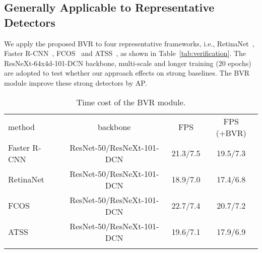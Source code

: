 \documentclass{article}
\def\ie{{i.e.}}
\begin{document}
\subsection{Generally Applicable to Representative Detectors}
\vspace{-2mm}
We apply the proposed BVR to four representative frameworks, \ie, RetinaNet~\cite{RetinaNet}, Faster R-CNN~\cite{ren2015faster,FPN}, FCOS~\cite{FCOS} and ATSS~\cite{zhang2019bridging}, as shown in Table~\ref{tab:verification}. The ResNeXt-64x4d-101-DCN backbone, multi-scale and longer training (20 epochs) are adopted to test whether our approach effects on strong baselines. The BVR module improve these strong detectors by  AP.

\begin{table}[t]
  \caption{Time cost of the BVR module.}
  \small
  \label{tab:inf}
  \centering
  \begin{tabular}{l|c|c|c}
    \Xhline{1.0pt}
    method & backbone & FPS & FPS (+BVR)\\
    \Xhline{1.0pt}
    Faster R-CNN    & ResNet-50/ResNeXt-101-DCN & 21.3/7.5 & 19.5/7.3  \\ 
    RetinaNet       & ResNet-50/ResNeXt-101-DCN & 18.9/7.0 & 17.4/6.8 \\ 
    FCOS  & ResNet-50/ResNeXt-101-DCN & 22.7/7.4 & 20.7/7.2\\
    ATSS & ResNet-50/ResNeXt-101-DCN & 19.6/7.1 & 17.9/6.9\\
    \Xhline{1.0pt}
  \end{tabular}
\vspace{-1em}
\end{table}
\end{document}
